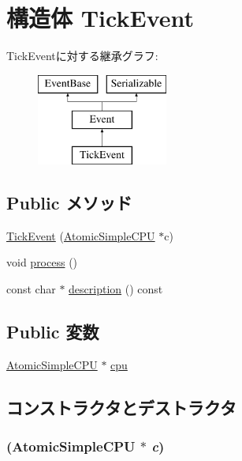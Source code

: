 \hypertarget{structAtomicSimpleCPU_1_1TickEvent}{
\section{構造体 TickEvent}
\label{structAtomicSimpleCPU_1_1TickEvent}
}
TickEventに対する継承グラフ:\begin{figure}[H]
\begin{center}
\leavevmode
\includegraphics[height=3cm]{structAtomicSimpleCPU_1_1TickEvent}
\end{center}
\end{figure}
\subsection*{Public メソッド}
\begin{DoxyCompactItemize}
\item 
\hyperlink{structAtomicSimpleCPU_1_1TickEvent_ad7e0906d397674efc0284e231e9ffa8e}{TickEvent} (\hyperlink{classAtomicSimpleCPU_1_1AtomicSimpleCPU}{AtomicSimpleCPU} $\ast$c)
\item 
void \hyperlink{structAtomicSimpleCPU_1_1TickEvent_a2e9c5136d19b1a95fc427e0852deab5c}{process} ()
\item 
const char $\ast$ \hyperlink{structAtomicSimpleCPU_1_1TickEvent_a5a14fe478e2393ff51f02e9b7be27e00}{description} () const 
\end{DoxyCompactItemize}
\subsection*{Public 変数}
\begin{DoxyCompactItemize}
\item 
\hyperlink{classAtomicSimpleCPU_1_1AtomicSimpleCPU}{AtomicSimpleCPU} $\ast$ \hyperlink{structAtomicSimpleCPU_1_1TickEvent_a9e783a4cebf1e9800f0368c175ed094f}{cpu}
\end{DoxyCompactItemize}


\subsection{コンストラクタとデストラクタ}
\hypertarget{structAtomicSimpleCPU_1_1TickEvent_ad7e0906d397674efc0284e231e9ffa8e}{
\subsubsection[{TickEvent}]{ ({\bf AtomicSimpleCPU} $\ast$ {\em c})}}
\label{structAtomicSimpleCPU_1_1TickEvent_ad7e0906d397674efc0284e231e9ffa8e}



